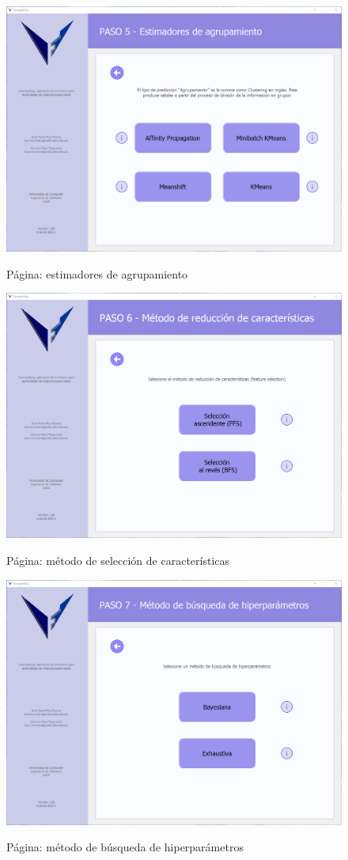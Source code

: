 \begin{figure}[H]
    \centering
    \caption{Página: estimadores de agrupamiento}
    \includegraphics[width=\textwidth]{views/clustering_estimators.png}
    \label{fig:clusterestimators}
\end{figure}

\begin{figure}[H]
    \centering
    \caption{Página: método de selección de características}
    \includegraphics[width=\textwidth]{views/feature_selection_method.png}
    \label{fig:featureselectionmethod}
\end{figure}

\begin{figure}[H]
    \centering
    \caption{Página: método de búsqueda de hiperparámetros}
    \includegraphics[width=\textwidth]{views/hiperparameter_search_method.png}
    \label{fig:hiperparamsearchmethod}
\end{figure}